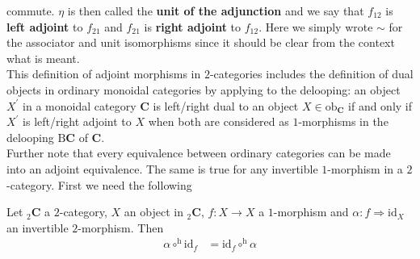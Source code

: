 commute. $\eta$ is then called the \textbf{unit of the adjunction} and we say that $f_{12}$ is \textbf{left adjoint} to $f_{21}$ and $f_{21}$ is \textbf{right adjoint} to $f_{12}$. Here we simply wrote $\sim$ for the associator and unit isomorphisms since it should be clear from the context what is meant.
\\
This definition of adjoint morphisms in $2$-categories includes the definition of dual objects in ordinary monoidal categories by applying to the delooping: an object $X^{\prime}$ in a monoidal category $\mathbf{C}$ is left/right dual to an object $X \in \mathrm{ob}_{\mathbf{C}}$ if and only if $X^{\prime}$ is left/right adjoint to $X$ when both are considered as $1$-morphisms in the delooping $\mathrm{B}\mathbf{C}$ of $\mathbf{C}$.
\\
Further note that every equivalence between ordinary categories can be made into an adjoint equivalence. The same is true for any invertible $1$-morphism in a $2$-category. First we need the following
\\
\begin{lem}
\label{lem:inv2commid}
Let ${_{2}}\mathbf{C}$ a $2$-category, $X$ an object in ${_{2}}\mathbf{C}$, $f \colon X \to X$ a $1$-morphism and $\alpha \colon f \Rightarrow \mathrm{id}_{X}$ an invertible $2$-morphism. Then
\begin{align*}
  \alpha
  \circ^{\mathrm{h}}
  \mathrm{id}_{f}
  &=
  \mathrm{id}_{f}
  \circ^{\mathrm{h}}
  \alpha
\end{align*}
\end{lem}
